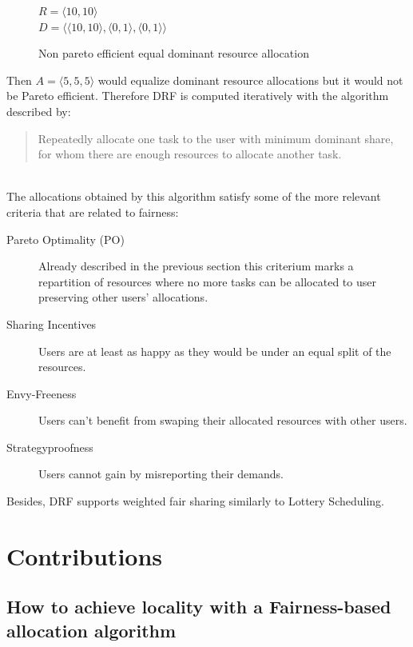\documentclass{svjour3}                     %
\begin{document}
\begin{figure}[!ht]
\centering
$R = \langle 10, 10 \rangle$ \\
$D = \langle \langle 10, 10 \rangle, \langle 0, 1 \rangle, \langle 0, 1 \rangle \rangle$ \\
\caption{Non pareto efficient equal dominant resource allocation}
\label{fig:nonpareto}
\end{figure}

Then $A = \langle 5, 5, 5 \rangle$ would equalize dominant resource
allocations but it would not be Pareto efficient. Therefore DRF is computed
iteratively with the algorithm described by: \\

\blockquote{Repeatedly allocate one task to the user with minimum dominant
share, for whom there are enough resources to allocate another task.} \\

The allocations obtained by this algorithm satisfy some of the more
relevant criteria that are related to fairness: \\

\begin{description}
  \item[Pareto Optimality (PO)] Already described in the previous
  section this criterium marks a repartition of resources where
  no more tasks can be allocated to user preserving other users'
  allocations.
  \item[Sharing Incentives]  Users are at least as happy as they
  would be under an equal split of the resources.
  \item[Envy-Freeness] Users can't benefit from swaping their
  allocated resources with other users.
  \item[Strategyproofness] Users cannot gain by misreporting
  their demands.
\end{description}

Besides, DRF supports weighted fair sharing similarly to Lottery
Scheduling. 

\section{Contributions}

\subsection {How to achieve locality with a Fairness-based allocation algorithm}
\end{document}
